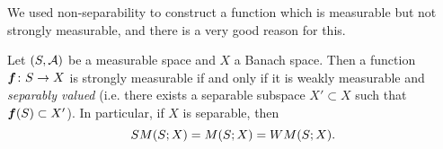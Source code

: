 We used non-separability to construct a function which is measurable but not strongly measurable, and there is a very good reason for this.

\begin{thm}\label{thm:Pettis-measurability}
  Let $(S,\mathcal{A})$ be a measurable space and $X$ a Banach space.
  Then a function $\bm{f} \colon S \rightarrow X$ is strongly measurable if and only if it is weakly measurable and \emph{separably valued} (i.e. there exists a separable subspace $X' \subset X$ such that $\bm{f}(S) \subset X'$).
  In particular, if $X$ is separable, then
  \begin{equation*}
    SM(S;X) = M(S;X) = WM(S;X).
  \end{equation*}
\end{thm}

